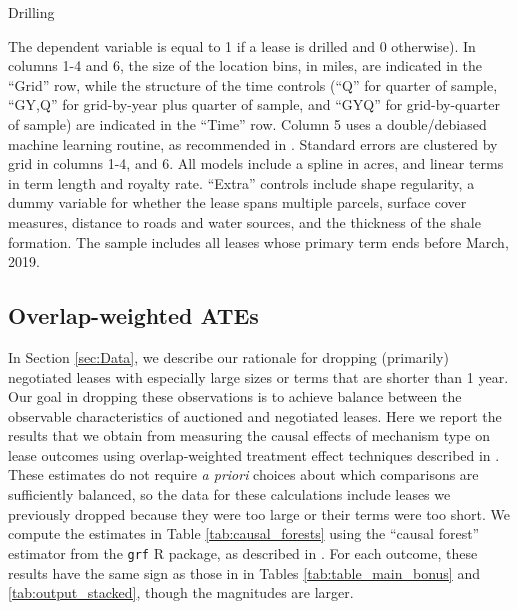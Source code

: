 \documentclass[12pt]{article}
\begin{document}
\begin{appendices}
\begin{table}[H]
	\begin{center}
	\begin{threeparttable}
	\caption{Drilling}
	\label{tab:drilled}
	\small
	            
		\begin{tablenotes}
		\footnotesize
		\item The dependent variable is equal to 1 if a lease is drilled and 0 otherwise).  In columns 1-4 and 6, the size of the location bins, in miles, are indicated in the ``Grid'' row, while the structure of the time controls (``Q'' for quarter of sample, ``GY,Q'' for grid-by-year plus quarter of sample, and ``GYQ'' for grid-by-quarter of sample) are indicated in the ``Time'' row.  Column 5 uses a double/debiased machine learning routine, as recommended in \cite{chernozhukov2018double}.  Standard errors are clustered by grid in columns 1-4, and 6.  All models include a spline in acres, and linear terms in term length and royalty rate. ``Extra'' controls include shape regularity, a dummy variable for whether the lease spans multiple parcels, surface cover measures, distance to roads and water sources, and the thickness of the shale formation.  The sample includes all leases whose primary term ends before March, 2019.       
		\end{tablenotes}	   
	\end{threeparttable}
	\end{center}
\end{table}
\addtolength{\tabcolsep}{-6pt}



\subsection{Overlap-weighted ATEs}\label{sec:overlap}
In Section \ref{sec:Data}, we describe our rationale for dropping (primarily) negotiated leases with especially large sizes or terms that are shorter than 1 year.  Our goal in dropping these observations is to achieve balance between the observable characteristics of auctioned and negotiated leases.  Here we report the results that we obtain from measuring the causal effects of mechanism type on lease outcomes using overlap-weighted treatment effect techniques described in \cite{li2018balancing}.  These estimates do not require \textit{a priori} choices about which comparisons are sufficiently balanced, so the data for these calculations include leases we previously dropped because they were too large or their terms were too short.  We compute the estimates in Table \ref{tab:causal_forests} using the ``causal forest'' estimator from the \texttt{grf} R package, as described in \cite{athey2019generalized}.  For each outcome, these results have the same sign as those in in Tables \ref{tab:table_main_bonus} and \ref{tab:output_stacked}, though the magnitudes are larger.



\end{appendices}
\end{document}
